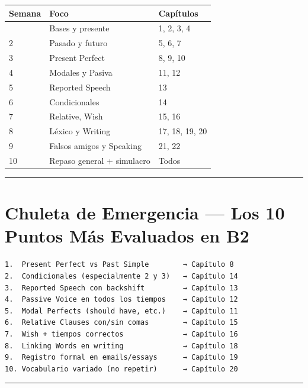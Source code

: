 \documentclass[
  spanish,
  letterpaper,
]{scrbook}
\begin{document}
\begin{longtable}[]{@{}lll@{}}
\toprule\noalign{}
Semana & Foco & Capítulos \\
\midrule\noalign{}
\endhead
\bottomrule\noalign{}
\endlastfoot
1 & Bases y presente & 1, 2, 3, 4 \\
2 & Pasado y futuro & 5, 6, 7 \\
3 & Present Perfect & 8, 9, 10 \\
4 & Modales y Pasiva & 11, 12 \\
5 & Reported Speech & 13 \\
6 & Condicionales & 14 \\
7 & Relative, Wish & 15, 16 \\
8 & Léxico y Writing & 17, 18, 19, 20 \\
9 & Falsos amigos y Speaking & 21, 22 \\
10 & Repaso general + simulacro & Todos \\
\end{longtable}

\begin{center}\rule{0.5\linewidth}{0.5pt}\end{center}

\section{Chuleta de Emergencia --- Los 10 Puntos Más Evaluados en
B2}\label{chuleta-de-emergencia-los-10-puntos-muxe1s-evaluados-en-b2}

\begin{verbatim}
1.  Present Perfect vs Past Simple        → Capítulo 8
2.  Condicionales (especialmente 2 y 3)   → Capítulo 14
3.  Reported Speech con backshift         → Capítulo 13
4.  Passive Voice en todos los tiempos    → Capítulo 12
5.  Modal Perfects (should have, etc.)    → Capítulo 11
6.  Relative Clauses con/sin comas        → Capítulo 15
7.  Wish + tiempos correctos              → Capítulo 16
8.  Linking Words en writing              → Capítulo 18
9.  Registro formal en emails/essays      → Capítulo 19
10. Vocabulario variado (no repetir)      → Capítulo 20
\end{verbatim}

\begin{center}\rule{0.5\linewidth}{0.5pt}\end{center}
\end{document}
